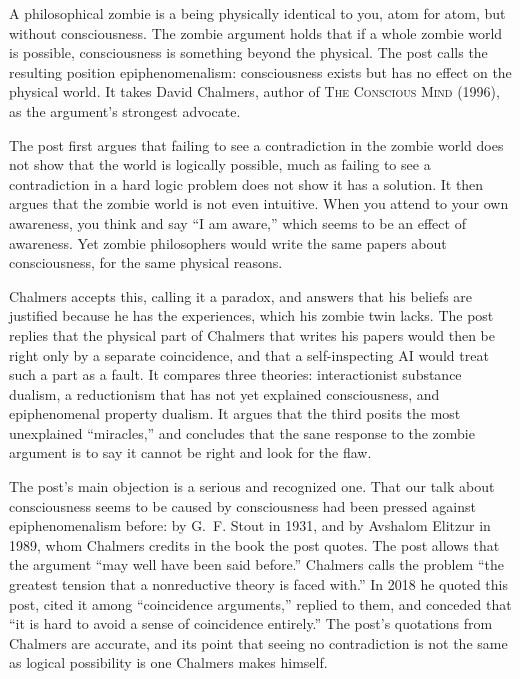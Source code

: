 \begin{afterword}
\summaryhead

A philosophical zombie is a being physically identical to you, atom for atom, but without consciousness. The zombie argument holds that if a whole zombie world is possible, consciousness is something beyond the physical. The post calls the resulting position epiphenomenalism: consciousness exists but has no effect on the physical world. It takes David Chalmers, author of \textsc{The Conscious Mind} (1996), as the argument's strongest advocate.

The post first argues that failing to see a contradiction in the zombie world does not show that the world is logically possible, much as failing to see a contradiction in a hard logic problem does not show it has a solution. It then argues that the zombie world is not even intuitive. When you attend to your own awareness, you think and say ``I am aware,'' which seems to be an effect of awareness. Yet zombie philosophers would write the same papers about consciousness, for the same physical reasons.

Chalmers accepts this, calling it a paradox, and answers that his beliefs are justified because he has the experiences, which his zombie twin lacks. The post replies that the physical part of Chalmers that writes his papers would then be right only by a separate coincidence, and that a self-inspecting AI would treat such a part as a fault. It compares three theories: interactionist substance dualism, a reductionism that has not yet explained consciousness, and epiphenomenal property dualism. It argues that the third posits the most unexplained ``miracles,'' and concludes that the sane response to the zombie argument is to say it cannot be right and look for the flaw.

\responsehead

The post's main objection is a serious and recognized one. That our talk about consciousness seems to be caused by consciousness had been pressed against epiphenomenalism before: by G.~F. Stout in 1931, and by Avshalom Elitzur in 1989, whom Chalmers credits in the book the post quotes. The post allows that the argument ``may well have been said before.'' Chalmers calls the problem ``the greatest tension that a nonreductive theory is faced with.'' In 2018 he quoted this post, cited it among ``coincidence arguments,'' replied to them, and conceded that ``it is hard to avoid a sense of coincidence entirely.'' The post's quotations from Chalmers are accurate, and its point that seeing no contradiction is not the same as logical possibility is one Chalmers makes himself.


\end{afterword}
